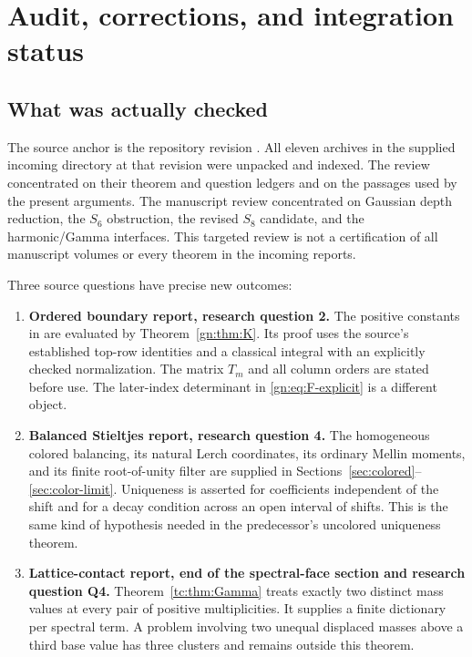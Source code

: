 \section{Audit, corrections, and integration status}
\label{sec:audit}

\subsection{What was actually checked}

The source anchor is the repository revision \pin. All eleven archives
in the supplied incoming directory at that revision were unpacked and
indexed. The review concentrated on their theorem and question ledgers
and on the passages used by the present arguments. The manuscript
review concentrated on Gaussian depth reduction, the $S_6$ obstruction,
the revised $S_8$ candidate, and the harmonic/Gamma interfaces.
This targeted review is not a certification of all manuscript volumes
or every theorem in the incoming reports.

Three source questions have precise new outcomes:

\begin{enumerate}
\item \textbf{Ordered boundary report, research question 2.}
The positive constants in  are
evaluated by Theorem~\ref{gn:thm:K}. Its proof uses the source's
established top-row identities and a classical integral with an
explicitly checked normalization. The matrix $T_m$ and all column
orders are stated before use. The later-index determinant in
\eqref{gn:eq:F-explicit} is a different object.

\item \textbf{Balanced Stieltjes report, research question 4.}
The homogeneous colored balancing, its natural Lerch coordinates,
its ordinary Mellin moments, and its finite root-of-unity filter
are supplied in Sections~\ref{sec:colored}--\ref{sec:color-limit}.
Uniqueness is asserted for coefficients independent of the shift
and for a decay condition across an open interval of shifts.
This is the same kind of hypothesis needed in the predecessor's
uncolored uniqueness theorem.

\item \textbf{Lattice-contact report, end of the spectral-face section
and research question Q4.}
Theorem~\ref{tc:thm:Gamma} treats exactly two distinct mass values at
every pair of positive multiplicities. It supplies a finite
dictionary per spectral term. A problem involving two unequal
displaced masses above a third base value has three clusters and
remains outside this theorem.
\end{enumerate}

